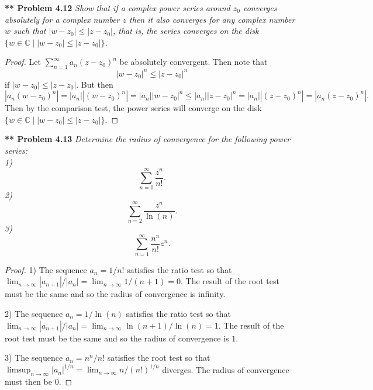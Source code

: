 \documentclass{article}
\begin{document}
\begin{flushleft}
\textbf{** Problem 4.12}
\textit{Show that if a complex power series around $z_0$ converges absolutely for a complex number $z$ then it also converges for any complex number $w$ such that $|w - z_0| \leq |z - z_0|$, that is, the series converges on the disk $\{w \in \mathbb{C} \mid |w - z_0| \leq |z - z_0|\}$.}
\begin{proof}
Let $\sum_{n=1}^{\infty} a_n (z - z_0)^n$ be absolutely convergent. Then note that
\[
|w-z_0|^n \leq |z-z_0|^n
\]
if $|w-z_0| \leq |z-z_0|$. But then
\[
|a_n (w-z_0)^n| = |a_n||(w-z_0)^n| = |a_n||w-z_0|^n \leq |a_n||z-z_0|^n = |a_n||(z-z_0)^n| = |a_n (z-z_0)^n|.
\]
Then by the comparison test, the power series will converge on the disk $\{w \in \mathbb{C} \mid |w - z_0| \leq |z - z_0|\}$.
\end{proof}

\textbf{** Problem 4.13}
\textit{Determine the radius of convergence for the following power series:\\
1)
\[
\sum_{n=0}^{\infty} \frac{z^n}{n!}.
\]
2)
\[
\sum_{n=2}^{\infty} \frac{z^n}{\ln (n)}.
\]
3)
\[
\sum_{n=1}^{\infty} \frac{n^n}{n!}z^n.
\]}
\begin{proof}
1) The sequence $a_n = 1/n!$ satisfies the ratio test so that $\lim_{n \rightarrow \infty} |a_{n+1}|/|a_n| = \lim_{n \rightarrow \infty} 1/(n+1) = 0$. The result of the root test must be the same and so the radius of convergence is infinity.\newline

2) The sequence $a_n = 1/\ln (n)$ satisfies the ratio test so that $\lim_{n \rightarrow \infty} |a_{n+1}|/|a_n| = \lim_{n \rightarrow \infty} \ln (n+1)/\ln (n) = 1$. The result of the root test must be the same and so the radius of convergence is $1$.\newline

3) The sequence $a_n = n^n/n!$ satisfies the root test so that $\limsup_{n \rightarrow \infty} |a_n|^{1/n} = \lim_{n \rightarrow \infty} n/(n!)^{1/n}$ diverges. The radius of convergence must then be $0$.
\end{proof}


\end{flushleft}
\end{document}
